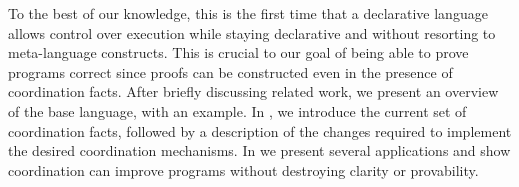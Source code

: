 To the best of our knowledge, this is the first time that a declarative language
allows control over execution while staying declarative and without resorting to
meta-language constructs. This is crucial to our goal of being able to prove
programs correct since proofs can be constructed even in the presence of
coordination facts.  After briefly discussing related work, we present an
overview of the base language, with an example. In
, we introduce the current set of coordination
facts, followed by a description of the changes required to implement the
desired coordination mechanisms. In  we present
several applications and show coordination can improve programs without
destroying clarity or provability.
